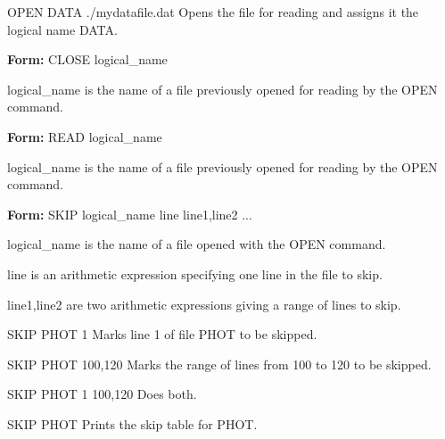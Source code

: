 {\newpage\clearpage
{}%
\begin{example}
  \item[OPEN DATA ./mydatafile.dat\hfill]{ Opens the file for reading
       and assigns it the logical name DATA.}
\end{example}%
\lthtmlfigureZ
\lthtmlcheckvsize\clearpage}

{\newpage\clearpage
{}%
\begin{command}
  \item[\textbf{Form: }CLOSE logical\_name\hfill]{}
  \item[logical\_name]{is the name of a file previously
       opened for reading by the OPEN command.}
\end{command}%
\lthtmlfigureZ
\lthtmlcheckvsize\clearpage}

{\newpage\clearpage
{}%
\begin{command}
  \item[\textbf{Form: }READ logical\_name\hfill]{}
  \item[logical\_name]{is the name of a file previously
       opened for reading by the OPEN command.}
\end{command}%
\lthtmlfigureZ
\lthtmlcheckvsize\clearpage}

{\newpage\clearpage
{}%
\begin{command}
  \item[\textbf{Form: }SKIP logical\_name line line1,line2 ...\hfill]{}
  \item[logical\_name]{is the name of a file opened with the OPEN command.}
  \item[line]{is an arithmetic expression specifying one line in the file
       to skip.}  
  \item[line1,line2]{are two arithmetic expressions giving a range of lines
       to skip.}
\end{command}%
\lthtmlfigureZ
\lthtmlcheckvsize\clearpage}

{\newpage\clearpage
{}%
\begin{example}
  \item[SKIP PHOT 1]{Marks line 1 of file PHOT to be skipped.}
  \item[SKIP PHOT 100,120]{Marks the range of lines from 100 to 120 to 
       be skipped.}
  \item[SKIP PHOT 1 100,120]{Does both.}
  \item[SKIP PHOT]{Prints the skip table for PHOT.}
\end{example}%
\lthtmlfigureZ
\lthtmlcheckvsize\clearpage}

